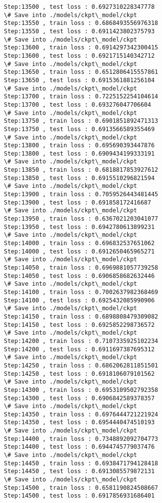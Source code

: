 \documentclass[11pt]{article}
\begin{document}
\begin{Verbatim}[commandchars=\\\{\}]
Step:13500 , test loss : 0.6927310228347778
\# Save into ./models/ckpt\_model/ckpt
Step:13550 , train loss : 0.6868493556976318
Step:13550 , test loss : 0.6911423802375793
\# Save into ./models/ckpt\_model/ckpt
Step:13600 , train loss : 0.6914297342300415
Step:13600 , test loss : 0.6921715140342712
\# Save into ./models/ckpt\_model/ckpt
Step:13650 , train loss : 0.6512806415557861
Step:13650 , test loss : 0.6915361881256104
\# Save into ./models/ckpt\_model/ckpt
Step:13700 , train loss : 0.7225152254104614
Step:13700 , test loss : 0.693276047706604
\# Save into ./models/ckpt\_model/ckpt
Step:13750 , train loss : 0.6901851892471313
Step:13750 , test loss : 0.6913566589355469
\# Save into ./models/ckpt\_model/ckpt
Step:13800 , train loss : 0.695690393447876
Step:13800 , test loss : 0.6909434199333191
\# Save into ./models/ckpt\_model/ckpt
Step:13850 , train loss : 0.6818817853927612
Step:13850 , test loss : 0.6915510296821594
\# Save into ./models/ckpt\_model/ckpt
Step:13900 , train loss : 0.7059526443481445
Step:13900 , test loss : 0.691858172416687
\# Save into ./models/ckpt\_model/ckpt
Step:13950 , train loss : 0.6367021203041077
Step:13950 , test loss : 0.6942780613899231
\# Save into ./models/ckpt\_model/ckpt
Step:14000 , train loss : 0.696832537651062
Step:14000 , test loss : 0.6912650465965271
\# Save into ./models/ckpt\_model/ckpt
Step:14050 , train loss : 0.6969881057739258
Step:14050 , test loss : 0.6906858682632446
\# Save into ./models/ckpt\_model/ckpt
Step:14100 , train loss : 0.7002637982368469
Step:14100 , test loss : 0.6925432085990906
\# Save into ./models/ckpt\_model/ckpt
Step:14150 , train loss : 0.6898808479309082
Step:14150 , test loss : 0.6925852298736572
\# Save into ./models/ckpt\_model/ckpt
Step:14200 , train loss : 0.7107335925102234
Step:14200 , test loss : 0.6911697387695312
\# Save into ./models/ckpt\_model/ckpt
Step:14250 , train loss : 0.6862062811851501
Step:14250 , test loss : 0.6918106079101562
\# Save into ./models/ckpt\_model/ckpt
Step:14300 , train loss : 0.6953109502792358
Step:14300 , test loss : 0.6906842589378357
\# Save into ./models/ckpt\_model/ckpt
Step:14350 , train loss : 0.6976444721221924
Step:14350 , test loss : 0.6954440474510193
\# Save into ./models/ckpt\_model/ckpt
Step:14400 , train loss : 0.7348892092704773
Step:14400 , test loss : 0.6944745779037476
\# Save into ./models/ckpt\_model/ckpt
Step:14450 , train loss : 0.6938471794128418
Step:14450 , test loss : 0.6913085579872131
\# Save into ./models/ckpt\_model/ckpt
Step:14500 , train loss : 0.6581190824508667
Step:14500 , test loss : 0.6917856931686401

\end{Verbatim}
\end{document}
